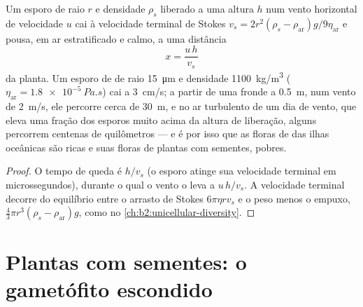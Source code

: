 \begin{theorem}\label{thm:b2:plant-life-cycles:dispersal}
Um esporo de raio $r$ e densidade $\rho_s$ liberado a uma altura $h$
num vento horizontal de velocidade $u$ cai à velocidade terminal de
Stokes $v_s = 2r^2(\rho_s - \rho_{\text{ar}})g/9\eta_{\text{ar}}$
e pousa, em ar estratificado e calmo, a uma distância
\[
x = \frac{u\,h}{v_s}
\]
da planta. Um esporo de  de raio \qty{15}{\micro m} e
densidade \qty{1100}{kg/m^3} ($\eta_{\text{ar}} = \qty{1.8e-5}{Pa.s}$)
cai a \qty{3}{cm/s}; a partir de uma fronde a \qty{0.5}{m}, num vento
de \qty{2}{m/s}, ele percorre cerca de \qty{30}{m}, e no ar turbulento
de um dia de vento, que eleva uma fração dos esporos muito acima da
altura de liberação, alguns percorrem centenas de quilômetros --- e é
por isso que as floras de  das ilhas oceânicas são ricas e
suas floras de plantas com sementes, pobres.
\end{theorem}
\begin{proof}
O tempo de queda é $h/v_s$ (o esporo atinge sua velocidade terminal em
microssegundos), durante o qual o vento o leva a $u\,h/v_s$. A
velocidade terminal decorre do equilíbrio entre o arrasto de Stokes
$6\pi\eta r
v_s$ e o peso menos o empuxo, $\tfrac43\pi r^3(\rho_s -
\rho_{\text{ar}})g$, como no \cref{ch:b2:unicellular-diversity}.
\end{proof}

\section{Plantas com sementes: o gametófito escondido}

